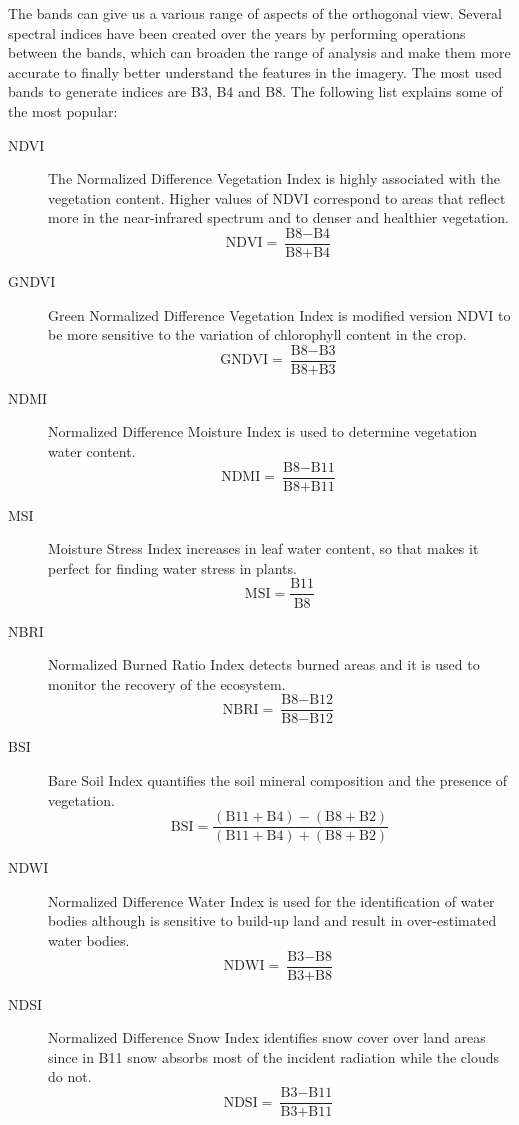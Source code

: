 \documentclass[11pt, a4paper]{article}
\begin{document}
The bands can give us a various range of aspects of the orthogonal view. Several spectral indices have been created over the years by performing operations between the bands, which can broaden the range of analysis and make them more accurate to finally better understand the features in the imagery. The most used bands to generate indices are B3, B4 and B8. The following list explains some of the most popular:
\begin{description}
		\item[NDVI] The Normalized Difference Vegetation Index is highly associated with the vegetation content. Higher values of NDVI correspond to areas that reflect more in the near-infrared spectrum and to denser and healthier vegetation.
		\[\text{NDVI} =  \frac{\text{B8} - \text{B4}}{\text{B8} + \text{B4}}\] 
		\item[GNDVI] Green Normalized Difference Vegetation Index is modified version NDVI to be more sensitive to the variation of chlorophyll content in the crop.
		\[\text{GNDVI} =  \frac{\text{B8} - \text{B3}}{\text{B8} + \text{B3}}\] 
		\item[NDMI] Normalized Difference Moisture Index is used to determine vegetation water content.
		\[\text{NDMI} = \frac{\text{B8} - \text{B11}}{\text{B8} + \text{B11}}\]
		\item[MSI] Moisture Stress Index increases in leaf water content, so that makes it perfect for finding water stress in plants.
		\[\text{MSI} = \frac{\text{B11}}{\text{B8}}\]
		\item[NBRI] Normalized Burned Ratio Index detects burned areas and it is used to monitor the recovery of the ecosystem.
		\[\text{NBRI} = \frac{\text{B8} - \text{B12}}{\text{B8} - \text{B12}}\]
		\item[BSI] Bare Soil Index quantifies the soil mineral composition and the presence of vegetation.
		\[\text{BSI} = \frac{(\text{B11} + \text{B4} )- (\text{B8} + \text{B2})}{(\text{B11} + \text{B4} ) + (\text{B8} + \text{B2})}\]
		\item[NDWI] Normalized Difference Water Index is used for the identification of water bodies although is sensitive to build-up land and result in over-estimated water bodies.
		\[\text{NDWI} = \frac{\text{B3} - \text{B8}}{\text{B3} + \text{B8}}\]
		\item[NDSI] Normalized Difference Snow Index identifies snow cover over land areas since in B11 snow absorbs most of the incident radiation while the clouds do not.
		\[\text{NDSI} = \frac{\text{B3} - \text{B11}}{\text{B3} + \text{B11}}\]
\end{description}
\end{document}
